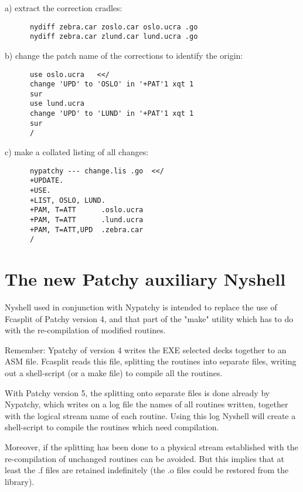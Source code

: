 a) extract the correction cradles:
\begin{verbatim}
      nydiff zebra.car zoslo.car oslo.ucra .go
      nydiff zebra.car zlund.car lund.ucra .go
\end{verbatim}
b) change the patch name of the corrections to identify the origin:
\begin{verbatim}
      use oslo.ucra   <</
      change 'UPD' to 'OSLO' in '+PAT'1 xqt 1
      sur
      use lund.ucra
      change 'UPD' to 'LUND' in '+PAT'1 xqt 1
      sur
      /
\end{verbatim}
c) make a collated listing of all changes:
\begin{verbatim}
      nypatchy --- change.lis .go  <</
      +UPDATE.
      +USE.
      +LIST, OSLO, LUND.
      +PAM, T=ATT      .oslo.ucra
      +PAM, T=ATT      .lund.ucra
      +PAM, T=ATT,UPD  .zebra.car
      /
\end{verbatim}


\section{The new Patchy auxiliary Nyshell}

\renewcommand{\labelenumi}{10.\theenumi)\ }

Nyshell used in conjunction with Nypatchy is intended to replace the use
of Fcasplit of Patchy version 4, and that part of the "make" utility which
has to do with the re-compilation of modified routines.

Remember: Ypatchy of version 4 writes the EXE selected decks together to
an ASM file. Fcasplit reads this file, splitting the routines into
separate files, writing out a shell-script (or a make file) to compile
all the routines.

With Patchy version 5, the splitting onto separate files is done already
by Nypatchy, which writes on a log file the names of all routines written,
together with the logical stream name of each routine. Using this log
Nyshell will create a shell-script to compile the routines which need
compilation.

Moreover, if the splitting has been done to a physical stream
established with  the re-compilation
of unchanged
routines can be avoided. But this implies that at least the .f files are
retained indefinitely (the .o files could be restored from the library).

